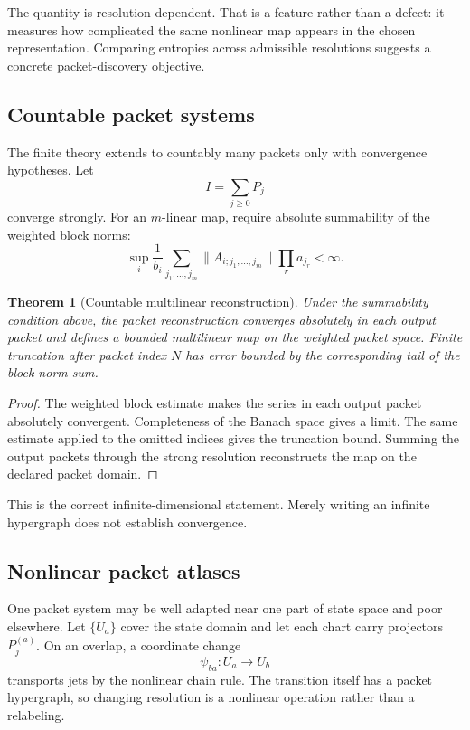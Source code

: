 \documentclass[11pt]{article}
\newtheorem{theorem}{Theorem}[section]
\theoremstyle{definition}
\theoremstyle{remark}
\begin{document}
The quantity is resolution-dependent.  That is a feature rather than a defect: it measures how complicated the same nonlinear map appears in the chosen representation.  Comparing entropies across admissible resolutions suggests a concrete packet-discovery objective.

\subsection{Countable packet systems}

The finite theory extends to countably many packets only with convergence hypotheses.  Let
\[
I=\sum_{j\ge0}P_j
\]
converge strongly.  For an $m$-linear map, require absolute summability of the weighted block norms:
\[
\sup_i\frac1{b_i}
\sum_{j_1,\ldots,j_m}
\|A_{i;j_1,\ldots,j_m}\|
\prod_ra_{j_r}
<\infty.
\]

\begin{theorem}[Countable multilinear reconstruction]
Under the summability condition above, the packet reconstruction converges absolutely in each output packet and defines a bounded multilinear map on the weighted packet space.  Finite truncation after packet index $N$ has error bounded by the corresponding tail of the block-norm sum.
\end{theorem}

\begin{proof}
The weighted block estimate makes the series in each output packet absolutely convergent.  Completeness of the Banach space gives a limit.  The same estimate applied to the omitted indices gives the truncation bound.  Summing the output packets through the strong resolution reconstructs the map on the declared packet domain.
\end{proof}

This is the correct infinite-dimensional statement.  Merely writing an infinite hypergraph does not establish convergence.

\subsection{Nonlinear packet atlases}

One packet system may be well adapted near one part of state space and poor elsewhere.  Let $\{U_a\}$ cover the state domain and let each chart carry projectors $P_j^{(a)}$.  On an overlap, a coordinate change
\[
\psi_{ba}:U_a\to U_b
\]
transports jets by the nonlinear chain rule.  The transition itself has a packet hypergraph, so changing resolution is a nonlinear operation rather than a relabeling.
\end{document}
